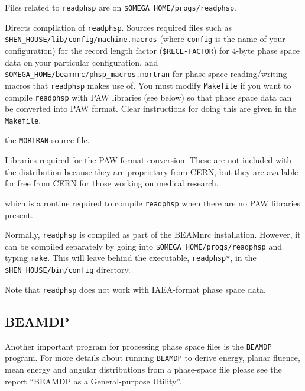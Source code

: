 \documentclass[12pt,twoside]{article}
\begin{document}
Files related to \verb+readphsp+ are on
\verb+$OMEGA_HOME/progs/readphsp+.
\begin{description}
\item [Makefile] Directs compilation of {\tt readphsp}.  Sources
required files such as\\
{\tt \$HEN\_HOUSE/lib/config/machine.macros}
(where {\tt config} is the name of your configuration) for the
record length factor ({\tt \$RECL-FACTOR}) for 4-byte phase space data on your
particular configuration, and
{\tt \$OMEGA\_HOME/beamnrc/phsp\_macros.mortran}
for phase space reading/writing macros that {\tt readphsp} makes use
of.  You must modify {\tt Makefile} if you want to compile
{\tt readphsp} with PAW libraries (see below) so that phase space data can
be converted into PAW format.  Clear instructions for doing this are given
in the {\tt Makefile}.

\item [readphsp.mortran] the \verb+MORTRAN+ source file.

\item [libpawlib.a, libpacklib.a (optional)]
Libraries required for the PAW format
conversion.  These are not included with the distribution because they
are proprietary from CERN, but they are available for free from CERN for
those working on medical research.

\item [dummy.f] which is a routine required to compile \verb+readphsp+
when there are no PAW libraries present.

\end{description}

Normally, {\tt readphsp} is compiled as part of the BEAMnrc installation.
However, it can be compiled separately by going into
{\tt \$OMEGA\_HOME/progs/readphsp} and typing {\tt make}.  This will
leave behind the executable, {\tt readphsp*}, in the
{\tt \$HEN\_HOUSE/bin/config} directory.

Note that {\tt readphsp} does not work with IAEA-format phase space data.

\subsection{BEAMDP}

Another important program for processing phase space files is the
\verb+BEAMDP+ program.  For more details about running \verb+BEAMDP+
to derive energy, planar fluence, mean energy and angular distributions
from a phase-space file please see the report
``BEAMDP as a General-purpose Utility''\cite{Ma95b}.
\end{document}
